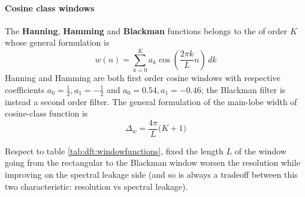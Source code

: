 		\paragraph{Cosine class windows} The \textbf{Hanning}, \textbf{Hamming} and \textbf{Blackman} functions belongs to the  of order $K$ whose general formulation is
		\begin{equation} \label{eq:dft:cosinewindows}
			w(n) = \sum_{k=0}^K a_k \cos \left(\frac{2\pi k}{L}n\right)\, dk
		\end{equation}
		Hanning and Hamming are both first order cosine windows with respective coefficients $a_0 = \frac 1 2,a_1 = - \frac 1 2$ and $a_0 = 0.54,a_1 = -0.46$; the Blackman filter is instead a second order filter. The general formulation of the main-lobe width of cosine-class function is
		\begin{equation}
			\Delta_w = \frac{4\pi}{L} \big(K+1\big)
		\end{equation}
		
		Respect to table \ref{tab:dft:windowfunctions}, fixed the length $L$ of the window going from the rectangular to the Blackman window worsen the resolution while improving on the spectral leakage side (and so is always a tradeoff between this two characteristic: resolution vs spectral leakage).
		
